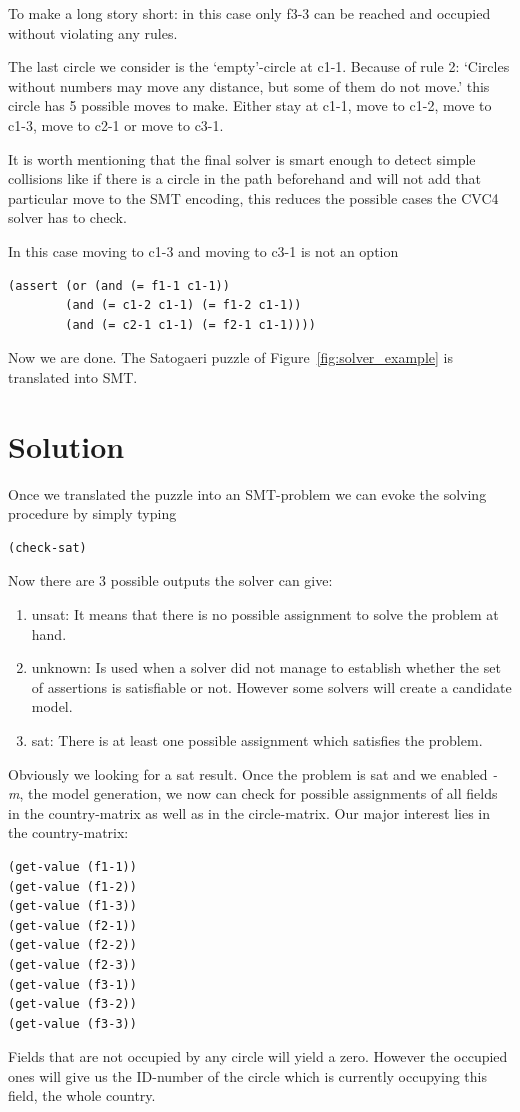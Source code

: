 To make a long story short: in this case only f3-3 can be reached and occupied without violating any rules.

The last circle we consider is the `empty'-circle at c1-1. Because of rule 2: `Circles without numbers may move any distance, but some of them do not move.' this circle has 5 possible moves to make. Either stay at c1-1, move to c1-2, move to c1-3, move to c2-1 or move to c3-1. 

It is worth mentioning that the final solver is smart enough to detect simple collisions like if there is a circle in the path beforehand and will not add that particular move to the SMT encoding, this reduces the possible cases the CVC4 solver has to check.

In this case moving to c1-3 and moving to c3-1 is not an option
\begin{lstlisting}
(assert (or (and (= f1-1 c1-1)) 
	    (and (= c1-2 c1-1) (= f1-2 c1-1))
	    (and (= c2-1 c1-1) (= f2-1 c1-1))))
\end{lstlisting}
Now we are done. The Satogaeri puzzle of Figure~\ref{fig:solver_example} is translated into SMT.


\section{Solution}
Once we translated the puzzle into an SMT-problem we can evoke the solving procedure by simply typing
\begin{lstlisting}
(check-sat)
\end{lstlisting}
Now there are 3 possible outputs the solver can give:
\begin{enumerate}
  \item unsat: It means that there is no possible assignment to solve the problem at hand.
  \item unknown: Is used when a solver did not manage to establish whether the set of assertions is satisfiable or not. However some solvers will create a candidate model.
  \item sat: There is at least one possible assignment which satisfies the problem.
\end{enumerate}
Obviously we looking for a sat result. Once the problem is sat and we enabled \emph{-m}, the model generation, we now can check for possible assignments of all fields in the country-matrix as well as in the circle-matrix. Our major interest lies in the country-matrix:
\begin{lstlisting}
(get-value (f1-1))
(get-value (f1-2))
(get-value (f1-3))
(get-value (f2-1))
(get-value (f2-2))
(get-value (f2-3))
(get-value (f3-1))
(get-value (f3-2))
(get-value (f3-3))
\end{lstlisting}
Fields that are not occupied by any circle will yield a zero. However the occupied ones will give us the ID-number of the circle which is currently occupying this field, the whole country.

